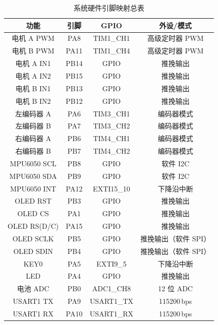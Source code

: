 \documentclass[12pt,a4paper,UTF8]{ctexrep}
\begin{document}
\begin{table}[H]
  \centering
  \caption{系统硬件引脚映射总表}
  \label{tbl:pins}
  \small
  \begin{tabular}{cccc}
    \toprule
    \textbf{功能} & \textbf{引脚} & \textbf{GPIO} & \textbf{外设/模式} \\
    \midrule
    电机 A PWM    & PA8  & TIM1\_CH1  & 高级定时器 PWM \\
    电机 B PWM    & PA11 & TIM1\_CH4  & 高级定时器 PWM \\
    电机 A IN1    & PB14 & GPIO       & 推挽输出 \\
    电机 A IN2    & PB15 & GPIO       & 推挽输出 \\
    电机 B IN1    & PB13 & GPIO       & 推挽输出 \\
    电机 B IN2    & PB12 & GPIO       & 推挽输出 \\
    左编码器 A    & PA6  & TIM3\_CH1  & 编码器模式 \\
    左编码器 B    & PA7  & TIM3\_CH2  & 编码器模式 \\
    右编码器 A    & PB6  & TIM4\_CH1  & 编码器模式 \\
    右编码器 B    & PB7  & TIM4\_CH2  & 编码器模式 \\
    MPU6050 SCL   & PB8  & GPIO       & 软件 I2C \\
    MPU6050 SDA   & PB9  & GPIO       & 软件 I2C \\
    MPU6050 INT   & PA12 & EXTI15\_10 & 下降沿中断 \\
    OLED RST      & PB3  & GPIO       & 推挽输出 \\
    OLED CS       & PA1  & GPIO       & 推挽输出 \\
    OLED RS(D/C)  & PA15 & GPIO       & 推挽输出 \\
    OLED SCLK     & PB5  & GPIO       & 推挽输出（软件 SPI） \\
    OLED SDIN     & PB4  & GPIO       & 推挽输出（软件 SPI） \\
    KEY0          & PA5  & EXTI9\_5   & 下降沿中断 \\
    LED           & PA4  & GPIO       & 推挽输出 \\
    电池 ADC      & PB0  & ADC1\_CH8  & 12 位 ADC \\
    USART1 TX     & PA9  & USART1\_TX & 115200\,bps \\
    USART1 RX     & PA10 & USART1\_RX & 115200\,bps \\
    \bottomrule
  \end{tabular}
\end{table}
\end{document}
